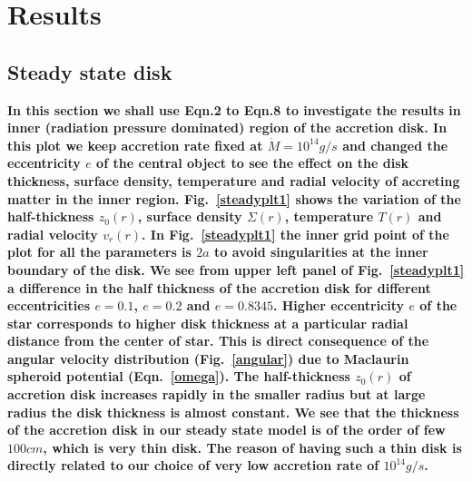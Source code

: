 \documentclass[useAMS,usenatbib]{mn2e}
\begin{document}
\section{Results}
\subsection{Steady state disk}
\textbf{In this section we shall use Eqn.2 to Eqn.8 to investigate the results in inner (radiation pressure dominated) region of the accretion disk. In this plot we keep accretion rate fixed at $\dot{M} = 10^{14} g/s$ and changed the eccentricity $e$ of the central object to see the effect on the disk thickness, surface density, temperature and radial velocity of accreting matter in the inner region. Fig.~\ref{steadyplt1} shows the variation of the half-thickness $z_0(r)$, surface density $\Sigma(r)$, temperature $T(r)$ and radial velocity $v_r(r)$. In Fig.~\ref{steadyplt1} the inner grid point of the plot for all the parameters is $2a$ to avoid singularities at the inner boundary of the disk. We see from upper left panel of Fig.~\ref{steadyplt1} a difference in the half thickness of the accretion disk for different eccentricities $e =0.1$, $e = 0.2$ and $e = 0.8345$. Higher eccentricity $e$ of the star corresponds to higher disk thickness at a particular radial distance from the center of star. This is direct consequence of the angular velocity distribution (Fig.~\ref{angular}) due to Maclaurin spheroid potential (Eqn.~\ref{omega}). The half-thickness $z_0(r)$ of accretion disk increases rapidly in the smaller radius but at large radius the disk thickness is almost constant. We see that the thickness of the accretion disk in our steady state model is of the order of few $100 cm$, which is very thin disk. The reason of having such a thin disk is directly related to our choice of very low accretion rate of $10^{14} g/s$.} 
\end{document}
